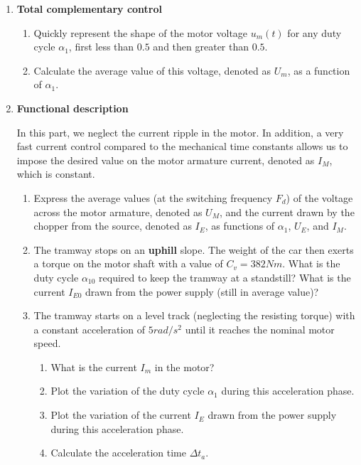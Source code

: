 \begin{enumerate}
\item \textbf{Total complementary control}

\begin{enumerate}
\item Quickly represent the shape of the motor voltage $u_m(t)$ for any duty cycle $\alpha_1$, first less than $0.5$ and then greater than $0.5$.
\item Calculate the average value of this voltage, denoted as $U_m$, as a function of $\alpha_1$.
\end{enumerate}

\item \textbf{Functional description}

In this part, we neglect the current ripple in the motor. In addition, a very fast current control compared to the mechanical time constants allows us to impose the desired value on the motor armature current, denoted as $I_M$, which is constant.

\begin{enumerate}
\item Express the average values (at the switching frequency $F_d$) of the voltage across the motor armature, denoted as $U_M$, and the current drawn by the chopper from the source, denoted as $I_E$, as functions of $\alpha_1$, $U_E$, and $I_M$.
\item The tramway stops on an \textbf{uphill} slope. The weight of the car then exerts a torque on the motor shaft with a value of $C_v = 382 Nm$. What is the duty cycle $\alpha_{10}$ required to keep the tramway at a standstill? What is the current $I_{E0}$ drawn from the power supply (still in average value)?
\item The tramway starts on a level track (neglecting the resisting torque) with a constant acceleration of $5 rad/s^2$ until it reaches the nominal motor speed.

\begin{enumerate}
\item What is the current $I_m$ in the motor?
\item Plot the variation of the duty cycle $\alpha_{1}$ during this acceleration phase.
\item Plot the variation of the current $I_E$ drawn from the power supply during this acceleration phase.
\item Calculate the acceleration time $\Delta t_a$.
\end{enumerate}


\end{enumerate}
\end{enumerate}

